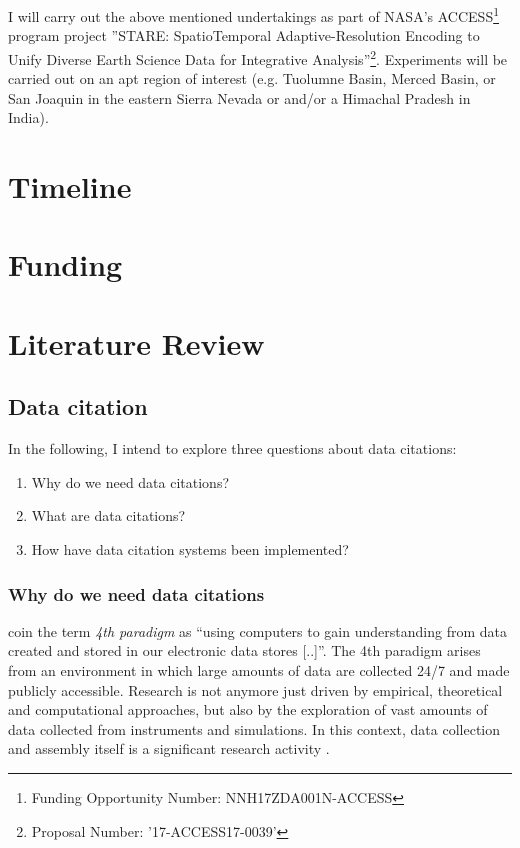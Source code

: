 \documentclass[letterpaper, parskip=half]{scrartcl}
\begin{document}
I will carry out the above mentioned undertakings as part of NASA's \gls{ACCESS}\footnote{Funding Opportunity Number: NNH17ZDA001N-ACCESS} program project ''STARE: SpatioTemporal Adaptive-Resolution Encoding to Unify Diverse Earth Science Data for Integrative Analysis''\footnote{Proposal Number: '17-ACCESS17-0039'}. Experiments will be carried out on an apt region of interest (e.g. Tuolumne Basin, Merced Basin, or San Joaquin in the eastern Sierra Nevada or and/or a Himachal Pradesh in India). 


\section{Timeline}


\section{Funding}


\newpage
\section{Literature Review}

\subsection{Data citation}
In the following, I intend to explore three questions about data citations:

\begin{enumerate}
 \item Why do we need data citations?
 \item What are data citations?
 \item How have data citation systems been implemented?
\end{enumerate}

\subsubsection{Why do we need data citations}    
\cite{Hey2009} coin the term \textit{4th paradigm} as ``using computers to gain understanding from data created and stored in our electronic data stores [..]''.
The 4th paradigm arises from an environment in which large amounts of data are collected 24/7 and made publicly accessible. Research is not anymore just driven by empirical, theoretical and computational approaches, but also by the exploration of vast amounts of data collected from instruments and simulations. In this context, data collection and assembly itself is a significant research activity \citep{Frew2012}.
\end{document}
